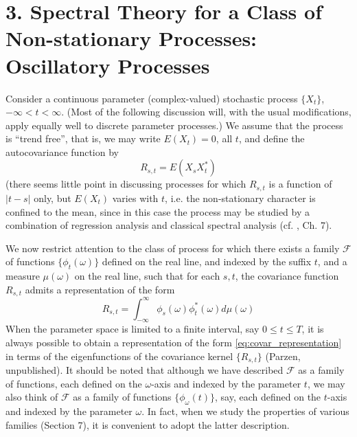 \documentclass{article}
\begin{document}
\section*{3. Spectral Theory for a Class of Non-stationary Processes:
Oscillatory Processes}

Consider a continuous parameter (complex-valued) stochastic process $\{X_t
\}$, $- \infty < t < \infty$. (Most of the following discussion will, with the
usual modifications, apply equally well to discrete parameter processes.) We
assume that the process is ``trend free'', that is, we may write $E (X_t) =
0$, all $t$, and define the autocovariance function by
\begin{equation}
  \label{eq:autocovariance} R_{s, t} = E (X_s X_t^{\ast})
\end{equation}
(there seems little point in discussing processes for which $R_{s, t}$ is a
function of $|t - s|$ only, but $E (X_t)$ varies with $t$, i.e. the
non-stationary character is confined to the mean, since in this case the
process may be studied by a combination of regression analysis and classical
spectral analysis (cf. {\cite{grenander1957}}, Ch. 7).

We now restrict attention to the class of process for which there exists a
family $\mathscr{F}$ of functions $\{\phi_t (\omega)\}$ defined on the real
line, and indexed by the suffix $t$, and a measure $\mu (\omega)$ on the real
line, such that for each $s, t$, the covariance function $R_{s, t}$ admits a
representation of the form
\begin{equation}
  \label{eq:covar_representation} R_{s, t} = \int_{- \infty}^{\infty} \phi_s
  (\omega) \phi_t^{\ast} (\omega) d \mu (\omega)
\end{equation}
When the parameter space is limited to a finite interval, say $0 \leqslant t
\leqslant T$, it is always possible to obtain a representation of the form
\eqref{eq:covar_representation} in terms of the eigenfunctions of the
covariance kernel $\{R_{s, t} \}$ (Parzen, unpublished). It should be noted
that although we have described $\mathscr{F}$ as a family of functions, each
defined on the $\omega$-axis and indexed by the parameter $t$, we may also
think of $\mathscr{F}$ as a family of functions $\{\phi_{\omega} (t)\}$, say,
each defined on the $t$-axis and indexed by the parameter $\omega$. In fact,
when we study the properties of various families (Section 7), it is convenient
to adopt the latter description.
\end{document}
